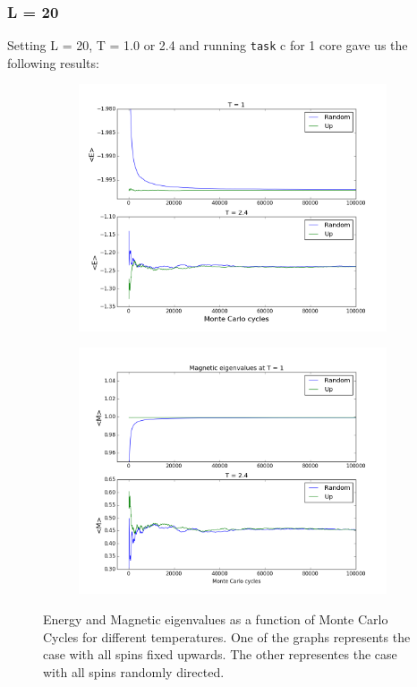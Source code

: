 \documentclass{article}
\begin{document}
\subsubsection*{L = 20}
Setting L = 20, T = 1.0 or 2.4 and running \texttt{task} c for 1 core gave us the following results:
\begin{figure}[H]
\centering
\begin{subfigure}{0.49 \textwidth}
\includegraphics[scale=0.29]{../figures/task_c/energyeig.png}
\label{fig:cEeig}
\end{subfigure}
\begin{subfigure}{0.49 \textwidth}
\centering
\includegraphics[scale=0.29]{../figures/task_c/Mageig.png}
\label{fig:cMeig}
\end{subfigure}
\caption{Energy and Magnetic eigenvalues as a function of Monte Carlo Cycles for different temperatures. One of the graphs represents the case with all spins fixed upwards. The other representes the case with all spins randomly directed.}
\label{fig:c}
\end{figure}
\end{document}
